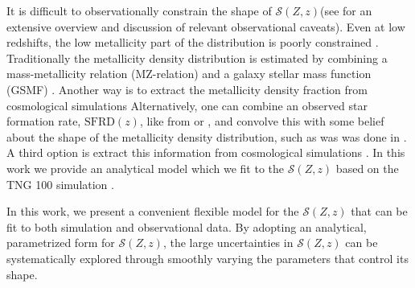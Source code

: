 \documentclass[twocolumn]{aastex631}
\newcommand{\SFRDzZ}{\ensuremath{\mathcal{S}(Z,z)}\xspace}
\newcommand{\SFRDz}{\ensuremath{\mathrm{SFRD}(z)}\xspace}
\newcommand{\dpdZ}{\ensuremath{\mathrm{dP/dZ}(Z,z)}\xspace}
\begin{document}
It is difficult to observationally constrain the shape of \SFRDzZ (see \cite{Chruslinska2019_obs} for an extensive overview and discussion of relevant observational caveats). Even at low redshifts, the low metallicity part of the distribution is poorly constrained \citep{Chruslinska+2021}.
Traditionally the metallicity density distribution is estimated by combining a mass-metallicity relation (MZ-relation) and a galaxy stellar mass function (GSMF) \citep[see also][]{Chruslinska+2018, Chruslinska2019_effectCO, Broekgaarden+2021a}.
Another way is to extract the metallicity density fraction from cosmological simulations \citep[e.g.]{Mapelli2017, Schneider+2017}
Alternatively, one can combine an observed star formation rate, \SFRDz, like from \cite{MadauDickinson2014} or \cite{Madau+2017}, and convolve this with some belief about the shape of the metallicity density distribution, such as was was done in \cite{Neijssel+2019}.
A third option is extract this information from cosmological simulations \citep[e.g.][]{Mapelli+2017,Schneider+2017}.
In this work we provide an analytical model which we fit to the \SFRDzZ based on the TNG 100 simulation \citep{Pillepich2018, Weinberger2017}.





In this work, we present a convenient flexible model for the \SFRDzZ that can be fit to both simulation and observational data. By adopting an analytical, parametrized form for \SFRDzZ, the large uncertainties in \SFRDzZ can be systematically explored through smoothly varying the parameters that control its shape. 
\end{document}
